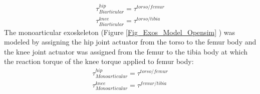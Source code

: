 \documentclass[10pt,letterpaper]{article}
\begin{document}
\begin{align}\label{Eqn_Biarticular_Torque_Act}
\tau^{hip}_{Biarticular} = \tau^{torso/femur}\\
\tau^{knee}_{Biarticular} = \tau^{torso/tibia}
\end{align}
The monoarticular exoskeleton (Figure \ref{Fig_Exos_Model_Opensim} ) was modeled by assigning the hip joint actuator from the torso to the femur body and the knee joint actuator was assigned from the femur to the tibia body at which the reaction torque of the knee torque applied to femur body:
\begin{align}\label{Eqn_Monoarticular_Torque_Act}
\tau^{hip}_{Monoarticular} = \tau^{torso/femur}\\
\tau^{knee}_{Monoarticular} = \tau^{femur/tibia}
\end{align}
\end{document}
